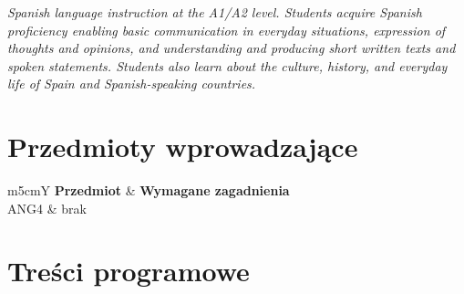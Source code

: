 \documentclass[12pt, a4paper]{article}
\newcommand{\thdrule}{\noalign{\global\setlength{\extrarowheight}{0pt}}}
\newcommand{\thdend}{\noalign{\global\setlength{\extrarowheight}{3pt}}}
\begin{document}
\textit{Spanish language instruction at the A1/A2 level. Students acquire Spanish proficiency enabling basic communication in everyday situations, expression of thoughts and opinions, and understanding and producing short written texts and spoken statements. Students also learn about the culture, history, and everyday life of Spain and Spanish-speaking countries.}


\section{Przedmioty wprowadzające}

{\scriptsize
\begin{tabularx}{\textwidth}{m{5cm}Y}
\thdrule\toprule
{} {\color{white}\textbf{Przedmiot}} & {\color{white}\textbf{Wymagane zagadnienia}} \\
\midrule\thdend
   ANG4 & brak \\
\bottomrule
\end{tabularx}}

\section{Treści programowe}
\end{document}
